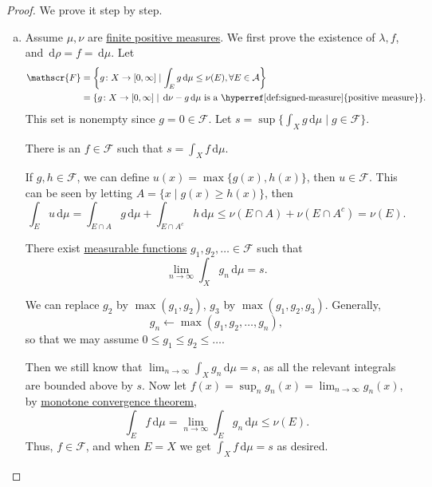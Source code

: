 \begin{proof}
	We prove it step by step.
	\begin{enumerate}[(a)]
		\item Assume \(\mu, \nu\) are \hyperref[def:finite-signed-measure]{finite positive measures}. We first prove the existence of \(\lambda , f\), and \(\,\mathrm{d} \rho = f = \,\mathrm{d} \mu \). Let
		      \[
			      \begin{split}
				      \mathscr{F}
				       & = \left\{g \colon X \to [0,\infty] \mid \int_E g \,\mathrm{d} \mu \leq \nu(E), \forall E \in \mathcal{A}\right\}                        \\
				       & = \{g \colon X \to [0,\infty] \mid \,\mathrm{d} \nu - g\,\mathrm{d} \mu \text{ is a \hyperref[def:signed-measure]{positive measure}}\}.
			      \end{split}
		      \]
		      This set is nonempty since \(g = 0 \in \mathscr{F}\). Let \(s = \sup\{\int_X g \,\mathrm{d} \mu \mid g \in \mathscr{F}\}\).

		      \begin{claim}
			      There is an \(f \in \mathscr{F}\) such that \(s = \int_X f \,\mathrm{d} \mu\).
		      \end{claim}
		      \begin{explanation}
			      If \(g, h \in \mathscr{F}\), we can define \(u(x) = \max\{g(x),h(x)\}\), then \(u \in \mathscr{F}\). This can be seen by letting \(A = \{x \mid g(x) \geq h(x)\}\), then
			      \[
				      \int_E u \,\mathrm{d} \mu = \int_{E \cap A} g \,\mathrm{d} \mu + \int_{E \cap A^c} h \,\mathrm{d} \mu
				      \leq \nu(E \cap A) + \nu(E \cap A^c) = \nu(E).
			      \]

			      There exist \hyperref[def:measurable-function]{measurable functions} \(g_1,g_2,\dots \in \mathscr{F}\) such that
			      \[
				      \lim_{n \to \infty} \int_X g_n \,\mathrm{d} \mu = s.
			      \]

			      We can replace \(g_2\) by \(\max(g_1,g_2)\), \(g_3\) by \(\max(g_1,g_2,g_3)\). Generally,
			      \[
				      g_{n} \gets \mathop{\max} (g_1, g_2, \dots , g_n),
			      \]
			      so that we may assume \(0 \leq g_1 \leq g_2 \leq \dots\).

			      Then we still know that \(\lim_{n \to \infty} \int_X g_n \,\mathrm{d} \mu = s\), as all the relevant integrals are bounded above by \(s\). Now let \(f(x) = \sup_n g_n(x) = \lim_{n \to \infty} g_n(x)\), by \hyperref[thm:MCT]{monotone convergence theorem},
			      \[
				      \int_E f \,\mathrm{d} \mu = \lim_{n \to \infty} \int_E g_n \,\mathrm{d} \mu \leq \nu(E).
			      \]
			      Thus, \(f \in \mathscr{F}\), and when \(E = X\) we get \(\int_X f \,\mathrm{d} \mu = s\) as desired.
		      \end{explanation}


\end{enumerate}
\end{proof}
